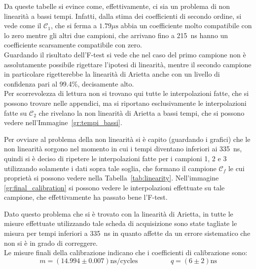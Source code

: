 Da queste tabelle si evince come, effettivamente, ci sia un problema di non linearità a bassi tempi. Infatti, dalla stima dei coefficienti di secondo ordine, si vede come il $\mathcal{C}_1$, che si ferma a $1.79 \mu\text{s}$ abbia un coefficiente molto compatibile con lo zero mentre gli altri due campioni, che arrivano fino a 215~ns hanno un coefficiente scarsamente compatibile con zero.\\

Guardando il risultato dell'F-test si vede che nel caso del primo campione non è assolutamente possibile rigettare l'ipotesi di linearità, mentre il secondo campione in particolare rigetterebbe la linearità di Arietta anche con un livello di confidenza pari al 99.4\%, decisamente alto.\\


Per scorrevolezza di lettura non si trovano qui tutte le interpolazioni fatte, che si possono trovare nelle appendici, ma si riportano esclusivamente le interpolazioni fatte su $\mathcal{C}_2$  che rivelano la non linearità di Arietta a bassi tempi, che si possono vedere nell'Immagine~\ref{gr:tempi_bassi}.\\

Per ovviare al problema della non linearità si è capito (guardando i grafici) che le non linearità sorgono nel momento in cui i tempi diventano inferiori ai 335~ns, quindi si è deciso di ripetere le interpolazioni fatte per i campioni 1, 2 e 3 utilizzando solamente i dati sopra tale soglia, che formano il campione $\mathcal{C}_f$ le cui proprietà si possono vedere nella Tabella~\ref{tab:linearity}. Nell'immagine \ref{gr:final_calibration} si possono vedere le interpolazioni effettuate su tale campione, che effettivamente ha passato bene l'F-test.\\

Dato questo problema che si è trovato con la linearità di Arietta, in tutte le misure effettuate utilizzando tale scheda di acquisizione sono state tagliate le misura per tempi inferiori a 335~ns in quanto affette da un errore sistematico che non si è in grado di correggere.\\

Le misure finali della calibrazione indicano che i coefficienti di calibrazione sono:
\begin{equation}
  m = (14.994 \pm 0.007) \text{ns/cycles} \hspace{2cm} q = (6 \pm 2) \text{ns}
\end{equation}


